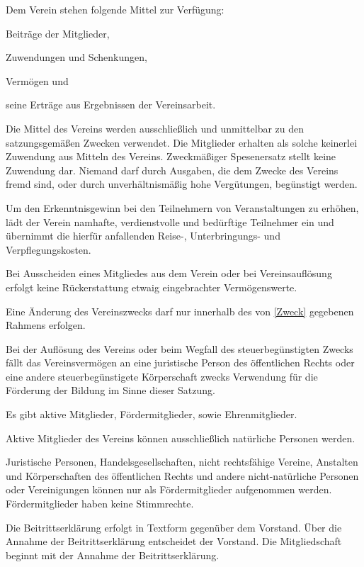 \documentclass[draft]{scrartcl}
\begin{document}
\begin{contract}
Dem Verein stehen folgende Mittel zur Verfügung:

\begin{compactitem}
  \item Beiträge der Mitglieder,
  \item Zuwendungen und Schenkungen,
  \item Vermögen und
  \item seine Erträge aus Ergebnissen der Vereinsarbeit.
\end{compactitem}

Die Mittel des Vereins werden ausschließlich und unmittelbar zu den
satzungsgemäßen Zwecken verwendet. Die Mitglieder erhalten als solche
keinerlei Zuwendung aus Mitteln des Vereins. Zweckmäßiger Spesenersatz stellt
keine Zuwendung dar. Niemand darf durch Ausgaben, die dem Zwecke des Vereins
fremd sind, oder durch unverhältnismäßig hohe Vergütungen, begünstigt werden.

Um den Erkenntnisgewinn bei den Teilnehmern von Veranstaltungen zu erhöhen,
lädt der Verein namhafte, verdienstvolle und bedürftige Teilnehmer ein und
übernimmt die hierfür anfallenden Reise-, Unterbringungs- und
Verpflegungskosten.

Bei Ausscheiden eines Mitgliedes aus dem Verein oder bei Vereinsauf\/lösung
erfolgt keine Rückerstattung etwaig eingebrachter Vermögenswerte.

Eine Änderung des Vereinszwecks darf nur innerhalb des von \ref{Zweck}
gegebenen Rahmens erfolgen.

Bei der Auf\/lösung des Vereins oder beim Wegfall des steuerbegünstigten
Zwecks fällt das Vereinsvermögen an eine juristische Person des öf\-fent\-lichen
Rechts oder eine andere steuerbegünstigete Körperschaft zwecks Verwendung
für die Förderung der Bildung im Sinne dieser Satzung.


Es gibt aktive Mitglieder, Fördermitglieder, sowie Ehrenmitglieder.

Aktive Mitglieder des Vereins können ausschließlich natürliche Personen
werden.

Juristische Personen, Handelsgesellschaften, nicht rechtsfähige Vereine,
Anstalten und Kör\-pers\-chaften des öff\-ent\-lich\-en Rechts und andere
nicht-natürliche Personen oder Vereinigungen können nur als Fördermitglieder
aufgenommen werden. Fördermitglieder haben keine Stimmrechte.

Die Beitrittserklärung erfolgt in Textform gegenüber dem Vorstand. Über die
Annahme der Beitrittserklärung entscheidet der Vorstand. Die Mitgliedschaft
beginnt mit der Annahme der Beitrittserklärung.


\end{contract}
\end{document}
